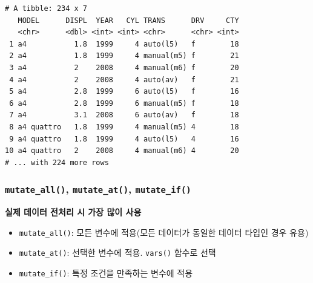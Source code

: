 \documentclass[
  11pt,
]{krantz}
\makeatletter
\newenvironment{Shaded}{\begin{snugshade}}{\end{snugshade}}
\newcommand{\CommentTok}[1]{\textcolor[rgb]{0.37,0.37,0.37}{\textit{#1}}}
\newcommand{\KeywordTok}[1]{\textcolor[rgb]{0.27,0.27,0.27}{\textbf{#1}}}
\newcommand{\NormalTok}[1]{#1}
\newcommand{\OperatorTok}[1]{\textcolor[rgb]{0.43,0.43,0.43}{\textbf{#1}}}
\newcommand{\StringTok}[1]{\textcolor[rgb]{0.5,0.5,0.5}{#1}}
\providecommand{\tightlist}{%
  \setlength{\itemsep}{0pt}\setlength{\parskip}{0pt}}
\newenvironment{kframe}{%
\medskip{}
\setlength{\fboxsep}{.8em}
 \def\at@end@of@kframe{}%
 \ifinner\ifhmode%
  \def\at@end@of@kframe{\end{minipage}}%
  \begin{minipage}{\columnwidth}%
 \fi\fi%
 \def\FrameCommand##1{\hskip\@totalleftmargin \hskip-\fboxsep
 \colorbox{shadecolor}{##1}\hskip-\fboxsep
     \hskip-\linewidth \hskip-\@totalleftmargin \hskip\columnwidth}%
 \MakeFramed {\advance\hsize-\width
   \@totalleftmargin\z@ \linewidth\hsize
   \@setminipage}}%
 {\par\unskip\endMakeFramed%
 \at@end@of@kframe}
\renewenvironment{quote}{\begin{kframe}}{\end{kframe}}
\makeatother
\begin{document}
\begin{Shaded}
\end{Shaded}

\begin{verbatim}
# A tibble: 234 x 7
   MODEL      DISPL  YEAR   CYL TRANS      DRV     CTY
   <chr>      <dbl> <int> <int> <chr>      <chr> <int>
 1 a4           1.8  1999     4 auto(l5)   f        18
 2 a4           1.8  1999     4 manual(m5) f        21
 3 a4           2    2008     4 manual(m6) f        20
 4 a4           2    2008     4 auto(av)   f        21
 5 a4           2.8  1999     6 auto(l5)   f        16
 6 a4           2.8  1999     6 manual(m5) f        18
 7 a4           3.1  2008     6 auto(av)   f        18
 8 a4 quattro   1.8  1999     4 manual(m5) 4        18
 9 a4 quattro   1.8  1999     4 auto(l5)   4        16
10 a4 quattro   2    2008     4 manual(m6) 4        20
# ... with 224 more rows
\end{verbatim}

\normalsize

\hypertarget{mutate-variant}{%
\subsubsection*{\texorpdfstring{\texttt{mutate\_all()}, \texttt{mutate\_at()}, \texttt{mutate\_if()}}{mutate\_all(), mutate\_at(), mutate\_if()}}\label{mutate-variant}}


\begin{quote}
\textbf{실제 데이터 전처리 시 가장 많이 사용}

\begin{itemize}
\tightlist
\item
  \texttt{mutate\_all()}: 모든 변수에 적용(모든 데이터가 동일한 데이터 타입인 경우 유용)
\item
  \texttt{mutate\_at()}: 선택한 변수에 적용. \texttt{vars()} 함수로 선택
\item
  \texttt{mutate\_if()}: 특정 조건을 만족하는 변수에 적용
\end{itemize}
\end{quote}
\end{document}
